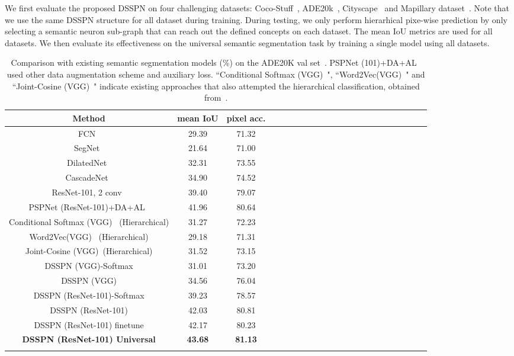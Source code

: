 \documentclass[10pt,twocolumn,letterpaper]{article}
\begin{document}
We first evaluate the proposed DSSPN on four challenging datasets: Coco-Stuff~\cite{caesar2016coco}, ADE20k~\cite{zhou2016semantic}, Cityscape~\cite{cordts2015cityscapes} and Mapillary dataset~\cite{neuhold2017mapillary}. Note that we use the same DSSPN structure for all dataset during training. During testing, we only perform hierarhical pixe-wise prediction by only selecting a semantic neuron sub-graph that can reach out the defined concepts on each dataset. The mean IoU metrics are used for all datasets. We then evaluate its effectiveness on the universal semantic segmentation task by training a single model using all datasets.

\begin{table}[!tp]\setlength{\tabcolsep}{2pt}
	\centering\footnotesize{\caption{ Comparison with existing semantic segmentation models (\%) on the ADE20K val set~\cite{zhou2016semantic}. PSPNet (101)+DA+AL~\cite{zhao2016pyramid} used other data augmentation scheme and auxiliary loss. ``Conditional Softmax (VGG)~\cite{redmon2016yolo9000}",  ``Word2Vec(VGG)~\cite{frome2013devise}" and ``Joint-Cosine (VGG)~\cite{zhao2017open}" indicate existing approaches that also attempted the hierarchical classification, obtained from~\cite{zhao2017open}.}\label{tab:ade}
	\begin{tabular}{cccccccccccccccccccccc}
		\toprule
		{Method} & mean IoU &  pixel acc. \\
		\midrule
		FCN~\cite{long2015fully} & 29.39 & 71.32 \\
        SegNet~\cite{badrinarayanan2015segnet} & 21.64 & 71.00 \\
        DilatedNet~\cite{yu2015multi} &32.31 & 73.55\\
        CascadeNet~\cite{zhou2016semantic} & 34.90 & 74.52\\
		ResNet-101, 2 conv~\cite{wu2016wider}  & 39.40 & 79.07  \\
		PSPNet (ResNet-101)+DA+AL~\cite{zhao2016pyramid} & 41.96 & {80.64}\\
		\hline
		Conditional Softmax (VGG)~\cite{redmon2016yolo9000} (Hierarchical) &  31.27  & 72.23\\
		Word2Vec(VGG)~\cite{frome2013devise} (Hierarchical) & 29.18 & 71.31\\
		Joint-Cosine (VGG)~\cite{zhao2017open}(Hierarchical) & 31.52 & 73.15\\
		\midrule
		DSSPN (VGG)-Softmax & 31.01 & 73.20 \\
		DSSPN (VGG) & 34.56 & 76.04 \\
		{DSSPN (ResNet-101)-Softmax} & {39.23} & {78.57}\\
		{DSSPN (ResNet-101)} & {42.03} & {80.81}\\
		{DSSPN (ResNet-101) finetune} & {42.17} & {80.23}\\
		\textbf{DSSPN (ResNet-101) Universal} & \textbf{43.68} & \textbf{81.13}\\
		\hline
				\vspace{-7mm}
	\end{tabular}}
\end{table}
\end{document}
